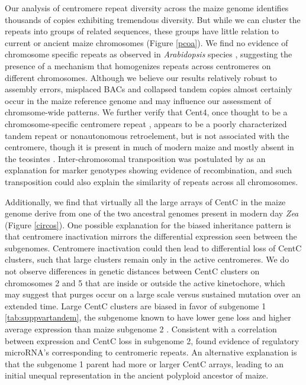 
Our analysis of centromere repeat diversity across the maize genome identifies thousands of copies exhibiting tremendous diversity. 
But while we can cluster the repeats into groups of related sequences, these groups have little relation to current or ancient maize chromosomes (Figure \ref{pcoa}).
We find no evidence of chromosome specific repeats as observed in \emph{Arabidopsis} species \citep{Kawabe2005, Pontes2004}, suggesting the presence of a mechanism that homogenizes repeats across centromeres on different chromosomes.
Although we believe our results relatively robust to assembly errors, misplaced BACs and collapsed tandem copies almost certainly occur in the maize  reference genome and may influence our assessment of chromsome-wide patterns.
We further verify that Cent4, once thought to be a chromosome-specific centromere repeat \citep{Page2001}, appears to be a poorly characterized tandem repeat or nonautonomous retroelement, but is not associated with the centromere, though it is present in much of modern maize and mostly absent in the teosintes \citep{albert2010}.  
Inter-chromosomal transposition was postulated by \citet{Shi2010} as an explanation for marker genotypes showing evidence of recombination, and such transposition could also explain the similarity of repeats across all chromosomes. 

Additionally, we find that virtually all the large arrays of CentC in the maize  genome derive from one of the two ancestral genomes present in modern day \emph{Zea} (Figure \ref{circos}).  
One possible explanation for the biased inheritance pattern is that centromere inactivation mirrors the differential expression seen between the subgenomes.  
Centromere inactivation could then lead to differential loss of CentC clusters, such that large clusters remain only in the active centromeres.
We do not observe differences in genetic distances between CentC clusters on chromosomes 2 and 5 that are inside or outside the active kinetochore, which may suggest that purges occur on a large scale versus sustained mutation over an extended time.
Large CentC clusters are biased in favor of subgenome 1 \ref{tab:suppvartandem}, the subgenome known to have lower gene loss and higher average expression than maize subgenome 2 \citep{Schnable2011}. 
Consistent with a correlation between expression and CentC loss in subgenome 2, \citet{ReinhartBartel2002} found evidence of regulatory microRNA’s corresponding to centromeric repeats.
An alternative explanation is that the subgenome 1 parent had more or larger CentC arrays, leading to an initial unequal representation in the ancient polyploid ancestor of maize.


